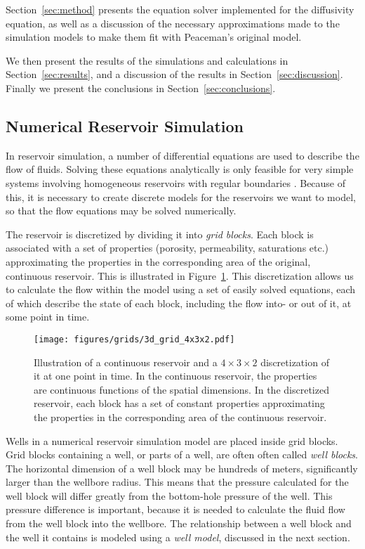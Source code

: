 Section~\ref{sec:method} presents the equation solver implemented for the diffusivity equation, as well as a discussion of the necessary approximations made to the simulation models to make them fit with Peaceman's original model.

We then present the results of the simulations and calculations in Section~\ref{sec:results}, and a discussion of the results in Section~\ref{sec:discussion}. Finally we present the conclusions in Section~\ref{sec:conclusions}.

\subsection{Numerical Reservoir Simulation} %
\label{sub:numerical_reservoir_simulation}
In reservoir simulation, a number of differential equations are used to describe the flow of fluids. Solving these equations analytically is only feasible for very simple systems involving homogeneous reservoirs with regular boundaries \cite{Peaceman1977Fundamentals}. Because of this, it is necessary to create discrete models for the reservoirs we want to model, so that the flow equations may be solved numerically.

The reservoir is discretized by dividing it into \emph{grid blocks}. Each block is associated with a set of properties (porosity, permeability, saturations etc.) approximating the properties in the corresponding area of the original, continuous reservoir. This is illustrated in Figure~\ref{fig:grid-discretization}. This discretization allows us to calculate the flow within the model using a set of easily solved equations, each of which describe the state of each block, including the flow into- or out of it, at some point in time.

\begin{figure}[htbp]
    \centering
    \texttt{[image: figures/grids/3d\_grid\_4x3x2.pdf]}
    \caption{Illustration of a continuous reservoir and a $4\times 3\times 2$ discretization of it at one point in time. In the continuous reservoir, the properties are continuous functions of the spatial dimensions. In the discretized reservoir, each block has a set of constant properties approximating the properties in the corresponding area of the continuous reservoir.}
    \label{fig:grid-discretization}
\end{figure}


Wells in a numerical reservoir simulation model are placed inside grid blocks. Grid blocks containing a well, or parts of a well, are often often called \emph{well blocks}. The horizontal dimension of a well block may be hundreds of meters, significantly larger than the wellbore radius. This means that the pressure calculated for the well block will differ greatly from the bottom-hole pressure of the well. This pressure difference is important, because it is needed to calculate the fluid flow  from the well block into the wellbore. The relationship between a well block and the well it contains is modeled using a \emph{well model}, discussed in the next section.

